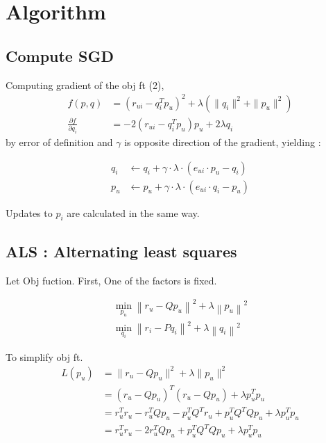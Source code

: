 \documentclass{article}
\begin{document}
\newpage

\section{Algorithm}
\subsection{Compute SGD}

Computing gradient of the obj ft (2),
\begin{align*}
    f(p, q) &= (r_{ui} - q_{i}^T p_{u})^2 + \lambda (\| q_{i} \|^2 + \| p_{u} \|^2) \\
    \frac{\partial f}{\partial q_{i}} &= -2(r_{ui} - q_{i}^T p_{u})p_u + 2\lambda q_i
\end{align*}
    by error of definition and $\gamma$ is opposite direction of the gradient, yielding :

\begin{align*}
q_{i} &\leftarrow q_{i} + \gamma \cdot \lambda \cdot (e_{ui} \cdot p_{u} - q_{i}) \\
p_{u} &\leftarrow p_{u} + \gamma \cdot \lambda \cdot (e_{ui} \cdot q_{i} - p_{u})
\end{align*}

Updates to $p_i$ are calculated in the same way.

\subsection{ALS : Alternating least squares}

Let Obj fuction. First, One of the factors is fixed.

\begin{align*}
\min_{p_u} \left\| r_u - Qp_u \right\|^2 + \lambda \left\| p_u \right\|^2 \\
\min_{q_i} \left\| r_i - Pq_i \right\|^2 + \lambda \left\| q_i \right\|^2
\end{align*}

To simplify obj ft.
\begin{align*}
L(p_u) &= \| r_u - Qp_u \|^2 + \lambda \| p_u \|^2 \\
       &= (r_u - Qp_u)^T(r_u - Qp_u) + \lambda p_u^T p_u \\
       &= r_u^T r_u - r_u^T Qp_u - p_u^T Q^T r_u + p_u^T Q^T Qp_u + \lambda p_u^T p_u \\
       &= r_u^T r_u - 2r_u^T Qp_u + p_u^T Q^T Qp_u + \lambda p_u^T p_u
\end{align*}
\end{document}
